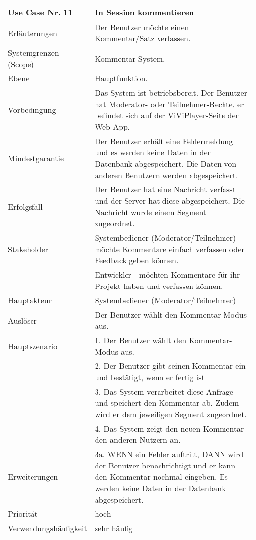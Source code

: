\begin{tabularx}{\linewidth}{|l|X|}
	\hline
	Use Case Nr. 11			& \textbf{In Session kommentieren} \\ \hline
	Erläuterungen			& Der Benutzer möchte einen Kommentar/Satz verfassen. \\ \hline
	Systemgrenzen (Scope)	& Kommentar-System. \\ \hline
	Ebene					& Hauptfunktion. \\ \hline
	Vorbedingung			& Das System ist betriebsbereit. Der Benutzer hat Moderator- oder 
							  Teilnehmer-Rechte, er befindet sich auf der ViViPlayer-Seite der Web-App. \\ \hline
	Mindestgarantie			& Der Benutzer erhält eine Fehlermeldung und es werden keine Daten 
							  in der Datenbank abgespeichert. Die Daten von anderen Benutzern werden abgespeichert. \\ \hline
	Erfolgsfall				& Der Benutzer hat eine Nachricht verfasst und der Server hat 
							  diese abgespeichert. Die Nachricht wurde einem Segment zugeordnet.\\ \hline
	Stakeholder				& Systembediener (Moderator/Teilnehmer) - möchte Kommentare einfach 
							  verfassen oder Feedback geben können.\\ 
                            & Entwickler - möchten Kommentare für ihr Projekt haben und 
                              verfassen können. \\ \hline
	Hauptakteur				& Systembediener (Moderator/Teilnehmer) \\ \hline
	Auslöser				& Der Benutzer wählt den Kommentar-Modus aus. \\ \hline	
	Hauptszenario			& 1. Der Benutzer wählt den Kommentar-Modus aus. \\
                            & 2. Der Benutzer gibt seinen Kommentar ein und bestätigt, wenn er 
                              fertig ist\\
							& 3. Das System verarbeitet diese Anfrage und speichert den 
							  Kommentar ab. Zudem wird er dem jeweiligen Segment zugeordnet. \\
							& 4. Das System zeigt den neuen Kommentar den anderen Nutzern an. \\ \hline
	Erweiterungen			& 3a. WENN ein Fehler auftritt, DANN wird der Benutzer 
							  benachrichtigt und er kann den Kommentar nochmal eingeben. Es werden keine Daten in der Datenbank abgespeichert.\\ \hline
	Priorität				& hoch \\ \hline
	Verwendungshäufigkeit	& sehr häufig \\ \hline
\end{tabularx}
